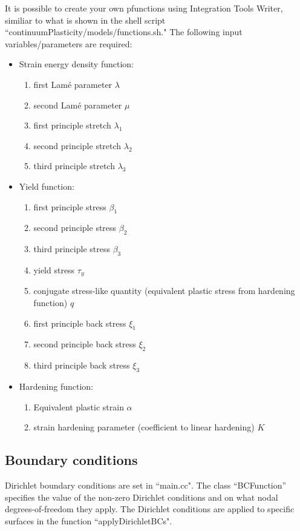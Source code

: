 \documentclass[10pt]{article}
\begin{document}
It is possible to create your own pfunctions using Integration Tools Writer, similiar to what is shown in the shell script ``continuumPlasticity/models/functions.sh." The following input variables/parameters are required:
\begin{itemize}
\itemsep-0.5em
\item Strain energy density function:
\vspace{-3mm}
\begin{enumerate}
\itemsep-0.5em 
\item first Lam\'e parameter $\lambda$
\item second Lam\'e parameter $\mu$
\item first principle stretch $\lambda_1$
\item second principle stretch $\lambda_2$
\item third principle stretch $\lambda_3$
\end{enumerate}
%
\item Yield function: 
\begin{enumerate}
\vspace{-3mm}
\itemsep-0.5em
\item first principle stress $\beta_1$
\item second principle stress $\beta_2$
\item third principle stress $\beta_3$
\item yield stress $\tau_y$
\item conjugate stress-like quantity (equivalent plastic stress from hardening function) $q$
\item first principle back stress $\xi_1$
\item second principle back stress $\xi_2$
\item third principle back stress $\xi_3$
\end{enumerate}
%
\item Hardening function: 
\begin{enumerate}
\vspace{-3mm}
\itemsep-0.5em
\item Equivalent plastic strain $\alpha$
\item strain hardening parameter (coefficient to linear hardening) $K$
\end{enumerate}
\end{itemize}

\subsection{Boundary conditions}
Dirichlet boundary conditions are set in ``main.cc". The class ``BCFunction'' specifies the value of the non-zero Dirichlet conditions and on what nodal degrees-of-freedom they apply. The Dirichlet conditions are applied to specific surfaces in the function ``applyDirichletBCs".
\end{document}
